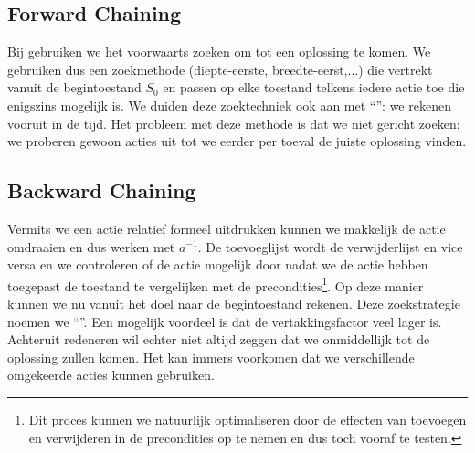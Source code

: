 \subsection{Forward Chaining}
Bij  gebruiken we het voorwaarts zoeken om tot een oplossing te komen. We gebruiken dus een zoekmethode (diepte-eerste, breedte-eerst,...) die vertrekt vanuit de begintoestand $S_0$ en passen op elke toestand telkens iedere actie toe die enigszins mogelijk is. We duiden deze zoektechniek ook aan met ``'': we rekenen vooruit in de tijd. Het probleem met deze methode is dat we niet gericht zoeken: we proberen gewoon acties uit tot we eerder per toeval de juiste oplossing vinden.
\subsection{Backward Chaining}
Vermits we een actie relatief formeel uitdrukken kunnen we makkelijk de actie omdraaien en dus werken met $a^{-1}$. De toevoeglijst wordt de verwijderlijst en vice versa en we controleren of de actie mogelijk door nadat we de actie hebben toegepast de toestand te vergelijken met de precondities\footnote{Dit proces kunnen we natuurlijk optimaliseren door de effecten van toevoegen en verwijderen in de precondities op te nemen en dus toch vooraf te testen.}. Op deze manier kunnen we nu vanuit het doel naar de begintoestand rekenen. Deze zoekstrategie noemen we ``''. Een mogelijk voordeel is dat de vertakkingsfactor veel lager is. Achteruit redeneren wil echter niet altijd zeggen dat we onmiddellijk tot de oplossing zullen komen. Het kan immers voorkomen dat we verschillende omgekeerde acties kunnen gebruiken.
